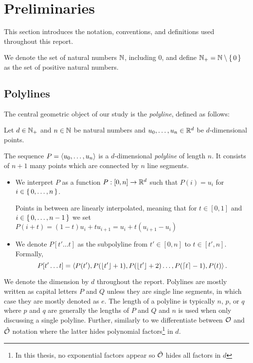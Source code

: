 \section{Preliminaries}
\label{sec:preliminaries}

This section introduces the notation, conventions, and definitions used throughout this report.  

We denote the set of natural numbers \(\mathbb{N}\), including \(0\), and define \(\mathbb{N}_+ = \mathbb{N} \setminus\set{0}\) as the set of positive natural numbers. 

\subsection{Polylines}
\label{ssec:polylines}

The central geometric object of our study is the \emph{polyline}, defined as follows:

\begin{definition}[Polyline]
  Let \(d\in \mathbb{N}_+\) and \(n \in \mathbb{N}\) be natural numbers and \(u_0, \dots, u_n \in \mathbb{R}^d\) be \(d\)-dimensional points. 

  The sequence \(P = \left\langle u_0, \dots, u_n\right\rangle\) is a \(d\)-dimensional \emph{polyline} of length \(n\). It consists of \(n+1\) many points which are connected by \(n\) line segments. 
  \begin{itemize}
    \item We interpret \(P\) as a function \(P:[0,n] \to \mathbb{R}^d\) such that \(P(i) = u_i\) for \(i \in \set{0, \dots, n}\).

      Points in between are linearly interpolated, meaning that for \(t \in [0, 1]\) and \(i \in \set{0, \dots, n - 1}\) we set \(P(i + t) = (1- t)u_i + t u_{i+1} = u_i + t(u_{i+1} - u_i)\)
    \item We denote \(P[t'\dots t]\) as the subpolyline from \(t' \in [0, n]\) to \(t \in [t', n]\). Formally, \[P[t'\dots t] = \left\langle P(t'), P(\left\lfloor t'\right\rfloor + 1),  P(\left\lfloor t'\right\rfloor + 2) \dots, P(\left\lceil t\right\rceil - 1), P(t)\right\rangle.\]
  \end{itemize}

\end{definition}
We denote the dimension by \(d\) throughout the report. Polylines are mostly written as capital letters \(P\) and \(Q\) unless they are single line segments, in which case they are mostly denoted as \(e\). The length of a polyline is typically \(n\), \(p\), or \(q\) where \(p\) and \(q\) are generally the lengths of \(P\) and \(Q\) and \(n\) is used when only discussing a single polyline. Further, similarly to \citeauthor{polyline_simplification_has_cubic_complexity_bringmannetal} we differentiate between \(\mathcal{O}\) and \(\hat{\mathcal{O}}\) notation where the latter hides polynomial factors\footnote{In this thesis, no exponential factors appear so \(\hat{\mathcal{O}}\) hides all factors in \(d\)} in \(d\). 

